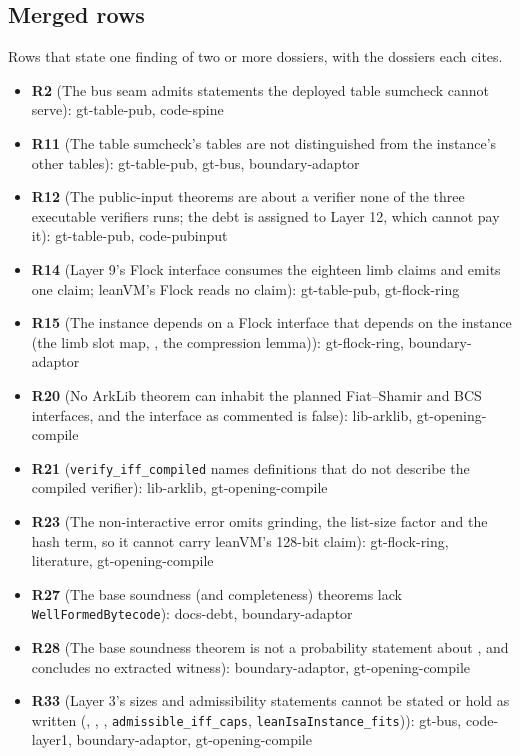 \subsection{Merged rows}\label{sec:reg-merged}

Rows that state one finding of two or more dossiers, with the dossiers each cites.
\begin{itemize}
\item \textbf{R2} (The bus seam admits statements the deployed table sumcheck cannot serve): gt-table-pub, code-spine
\item \textbf{R11} (The table sumcheck's tables are not distinguished from the instance's other tables): gt-table-pub, gt-bus, boundary-adaptor
\item \textbf{R12} (The public-input theorems are about a verifier none of the three executable verifiers runs; the debt is assigned to Layer 12, which cannot pay it): gt-table-pub, code-pubinput
\item \textbf{R14} (Layer 9's Flock interface consumes the eighteen limb claims and emits one claim; leanVM's Flock reads no claim): gt-table-pub, gt-flock-ring
\item \textbf{R15} (The instance depends on a Flock interface that depends on the instance (the limb slot map, , the compression lemma)): gt-flock-ring, boundary-adaptor
\item \textbf{R20} (No ArkLib theorem can inhabit the planned Fiat–Shamir and BCS interfaces, and the interface as commented is false): lib-arklib, gt-opening-compile
\item \textbf{R21} (\texttt{verify\_\allowbreak{}iff\_\allowbreak{}compiled} names definitions that do not describe the compiled verifier): lib-arklib, gt-opening-compile
\item \textbf{R23} (The non-interactive error omits grinding, the list-size factor and the hash term, so it cannot carry leanVM's 128-bit claim): gt-flock-ring, literature, gt-opening-compile
\item \textbf{R27} (The base soundness (and completeness) theorems lack \texttt{Well\allowbreak{}Formed\allowbreak{}Bytecode}): docs-debt, boundary-adaptor
\item \textbf{R28} (The base soundness theorem is not a probability statement about , and concludes no extracted witness): boundary-adaptor, gt-opening-compile
\item \textbf{R33} (Layer 3's sizes and admissibility statements cannot be stated or hold as written (, , , \texttt{admissible\_\allowbreak{}iff\_\allowbreak{}caps}, \texttt{lean\allowbreak{}Isa\allowbreak{}Instance\_\allowbreak{}fits})): gt-bus, code-layer1, boundary-adaptor, gt-opening-compile

\end{itemize}
